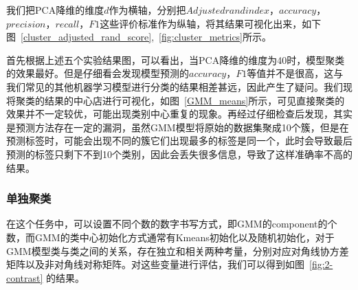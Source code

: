 \documentclass[UTF8]{ctexart}
\begin{document}
我们把PCA降维的维度$d$作为横轴，分别把$Adjusted rand index$，$accuracy$，$precision$，$recall$，$F1$这些评价标准作为纵轴，将其结果可视化出来，如下图~\ref{cluster_adjusted_rand_score},~\ref{fig:cluster_metrics}所示。








首先根据上述五个实验结果图，可以看出，当PCA降维的维度为40时，模型聚类的效果最好。但是仔细看会发现模型预测的$accuracy$，$F1$等值并不是很高，这与我们常见的其他机器学习模型进行分类的结果相差甚远，因此产生了疑问。我们现将聚类的结果的中心店进行可视化，如图~\ref{GMM_means}所示，可见直接聚类的效果并不一定较优，可能出现类别中心重复的现象。再经过仔细检查后发现，其实是预测方法存在一定的漏洞，虽然GMM模型将原始的数据集聚成10个簇，但是在预测标签时，可能会出现不同的簇它们出现最多的标签是同一个，此时会导致最后预测的标签只剩下不到10个类别，因此会丢失很多信息，导致了这样准确率不高的结果。

\subsubsection{单独聚类}

在这个任务中，可以设置不同个数的数字书写方式，即GMM的component的个数，而GMM的类中心初始化方式通常有Kmeans初始化以及随机初始化，对于GMM模型类与类之间的关系，存在独立和相关两种考量，分别对应对角线协方差矩阵以及非对角线对称矩阵。对这些变量进行评估，我们可以得到如图~\ref{fig:2-contrast} 的结果。
\end{document}
